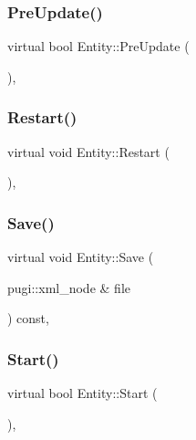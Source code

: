 \mbox{\label{class_entity_aa7c03939afe436c1d8e13a2b377019e7}} 
\subsubsection{\texorpdfstring{PreUpdate()}{PreUpdate()}}
{\footnotesize\ttfamily virtual bool Entity\+::\+Pre\+Update (\begin{DoxyParamCaption}{ }\end{DoxyParamCaption})\hspace{0.3cm}{\ttfamily [inline]}, {\ttfamily [virtual]}}

\mbox{\label{class_entity_a05ca1cde5003aa7d9f4c35ea03e0d55b}} 
\subsubsection{\texorpdfstring{Restart()}{Restart()}}
{\footnotesize\ttfamily virtual void Entity\+::\+Restart (\begin{DoxyParamCaption}{ }\end{DoxyParamCaption})\hspace{0.3cm}{\ttfamily [inline]}, {\ttfamily [virtual]}}

\mbox{\label{class_entity_a53b1ed004bde1e251ff63d12fa102f06}} 
\subsubsection{\texorpdfstring{Save()}{Save()}}
{\footnotesize\ttfamily virtual void Entity\+::\+Save (\begin{DoxyParamCaption}\item[{pugi\+::xml\+\_\+node \&}]{file }\end{DoxyParamCaption}) const\hspace{0.3cm}{\ttfamily [inline]}, {\ttfamily [virtual]}}

\mbox{\label{class_entity_aca7ceaadbeb569c3a981087018193104}} 
\subsubsection{\texorpdfstring{Start()}{Start()}}
{\footnotesize\ttfamily virtual bool Entity\+::\+Start (\begin{DoxyParamCaption}{ }\end{DoxyParamCaption})\hspace{0.3cm}{\ttfamily [inline]}, {\ttfamily [virtual]}}

